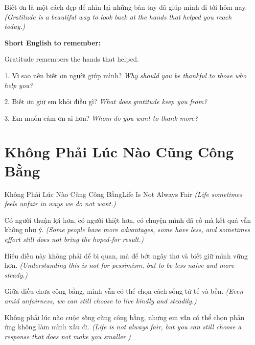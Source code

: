 \begin{baihoc}
Biết ơn là một cách đẹp để nhìn lại những bàn tay đã giúp mình đi tới hôm nay.
\textit{(Gratitude is a beautiful way to look back at the hands that helped you reach today.)}
\end{baihoc}

\begin{ghinhoanh}
\textbf{Short English to remember:}

Gratitude remembers the hands that helped.

\end{ghinhoanh}

\begin{tuhocnhanh}
1. Vì sao nên biết ơn người giúp mình? \textit{Why should you be thankful to those who help you?}

2. Biết ơn giữ em khỏi điều gì? \textit{What does gratitude keep you from?}

3. Em muốn cảm ơn ai hơn? \textit{Whom do you want to thank more?}
\end{tuhocnhanh}
\ngancach

\section{Không Phải Lúc Nào Cũng Công Bằng}
\begin{truyen}{Không Phải Lúc Nào Cũng Công Bằng}{Life Is Not Always Fair}
\textit{(Life sometimes feels unfair in ways we do not want.)}

Có người thuận lợi hơn, có người thiệt hơn, có chuyện mình đã cố mà kết quả vẫn không như ý.
\textit{(Some people have more advantages, some have less, and sometimes effort still does not bring the hoped-for result.)}

Hiểu điều này không phải để bi quan, mà để bớt ngây thơ và biết giữ mình vững hơn.
\textit{(Understanding this is not for pessimism, but to be less naive and more steady.)}

Giữa điều chưa công bằng, mình vẫn có thể chọn cách sống tử tế và bền.
\textit{(Even amid unfairness, we can still choose to live kindly and steadily.)}
\end{truyen}

\begin{baihoc}
Không phải lúc nào cuộc sống cũng công bằng, nhưng em vẫn có thể chọn phản ứng không làm mình xấu đi.
\textit{(Life is not always fair, but you can still choose a response that does not make you smaller.)}
\end{baihoc}

